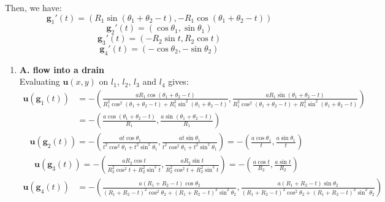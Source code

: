 \documentclass{article}
\begin{document}
\begin{enumerate}
\begin{enumerate}
  Then, we have:
  \begin{equation}
    \mathbf{g}_1'(t) = (R_1\sin(\theta_1 + \theta_2 -t ), -R_1\cos(\theta_1 + \theta_2 -t ))
  \end{equation}
  \begin{equation}
    \mathbf{g}_2'(t) = (\cos\theta_1, \sin\theta_1)
  \end{equation}
  \begin{equation}
    \mathbf{g}_3'(t) = (-R_2 \sin t, R_2\cos t)
  \end{equation}
  \begin{equation}
    \mathbf{g}_4'(t) = (-\cos \theta_2, -\sin\theta_2)
  \end{equation}
  \begin{enumerate}
    \item \textbf{A. flow into a drain}\\
    Evaluating \(\mathbf{u}(x,y)\) on \(l_1\), \(l_2\), \(l_3\) and \(l_4\) gives:
    \begin{align*}
      \mathbf{u}(\mathbf{g}_1(t))
      &= -\left(\frac{aR_1 \cos(\theta_1 + \theta_2 -t )  }{R_1^2 \cos^2(\theta_1 + \theta_2 -t ) +R_1^2 \sin^2(\theta_1 + \theta_2 -t ) }, \frac{aR_1 \sin(\theta_1 + \theta_2 -t )  }{R_1^2 \cos^2(\theta_1 + \theta_2 -t ) +R_1^2 \sin^2(\theta_1 + \theta_2 -t ) }\right)\\
      &= -\left(\frac{a \cos(\theta_1 + \theta_2 -t )}{R_1}, \frac{a \sin(\theta_1 + \theta_2 -t )}{R_1}\right)
    \end{align*}
    \begin{align*}
      \mathbf{u}(\mathbf{g}_2(t)) = -\left(\frac{a t \cos \theta_1}{t^2 \cos^2 \theta_1 +t^2 \sin^2 \theta_1}, \frac{a t \sin \theta_1}{t^2 \cos^2 \theta_1 +t^2 \sin^2 \theta_1}\right) = -\left(\frac{a\cos\theta_1}{t}, \frac{a\sin\theta_1}{t}\right)
    \end{align*}
    \begin{align*}
      \mathbf{u}(\mathbf{g}_3(t)) = - \left(\frac{aR_2\cos t}{R_2^2\cos^2 t+R_2^2\sin^2 t}, \frac{aR_2\sin t}{R_2^2\cos^2 t+R_2^2\sin^2 t}\right) = -\left(\frac{a\cos t}{R_2}, \frac{a\sin t}{R_2}\right)
    \end{align*}
    \begin{align*}
      \mathbf{u}(\mathbf{g}_4(t))
      &= - \left(\frac{a (R_1+R_2-t)\cos\theta_2}{(R_1+R_2-t)^2\cos^2\theta_2+(R_1+R_2-t)^2\sin^2\theta_2},
      \frac{a (R_1+R_2-t)\sin\theta_2}{(R_1+R_2-t)^2\cos^2\theta_2+(R_1+R_2-t)^2\sin^2\theta_2} \right)\\

\end{align*}
\end{enumerate}
\end{enumerate}
\end{enumerate}
\end{document}
